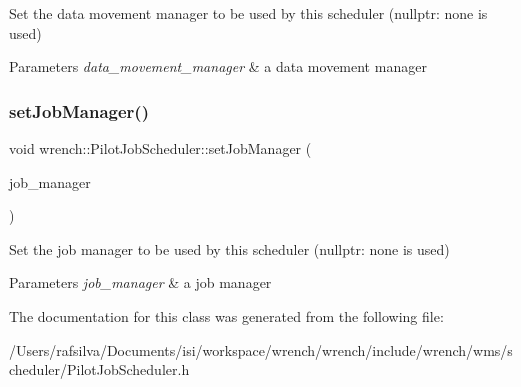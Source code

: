 Set the data movement manager to be used by this scheduler (nullptr\+: none is used) 


\begin{DoxyParams}{Parameters}
{\em data\+\_\+movement\+\_\+manager} & a data movement manager \\
\hline
\end{DoxyParams}
\mbox{\label{classwrench_1_1_pilot_job_scheduler_a8cc037ea3265c7d774fd61b05fa32142}} 
\subsubsection{\texorpdfstring{set\+Job\+Manager()}{setJobManager()}}
{\footnotesize\ttfamily void wrench\+::\+Pilot\+Job\+Scheduler\+::set\+Job\+Manager (\begin{DoxyParamCaption}\item[{\hyperlink{classwrench_1_1_job_manager}{Job\+Manager} $\ast$}]{job\+\_\+manager }\end{DoxyParamCaption})\hspace{0.3cm}{\ttfamily [inline]}}



Set the job manager to be used by this scheduler (nullptr\+: none is used) 


\begin{DoxyParams}{Parameters}
{\em job\+\_\+manager} & a job manager \\
\hline
\end{DoxyParams}


The documentation for this class was generated from the following file\+:\begin{DoxyCompactItemize}
\item 
/\+Users/rafsilva/\+Documents/isi/workspace/wrench/wrench/include/wrench/wms/scheduler/Pilot\+Job\+Scheduler.\+h\end{DoxyCompactItemize}
